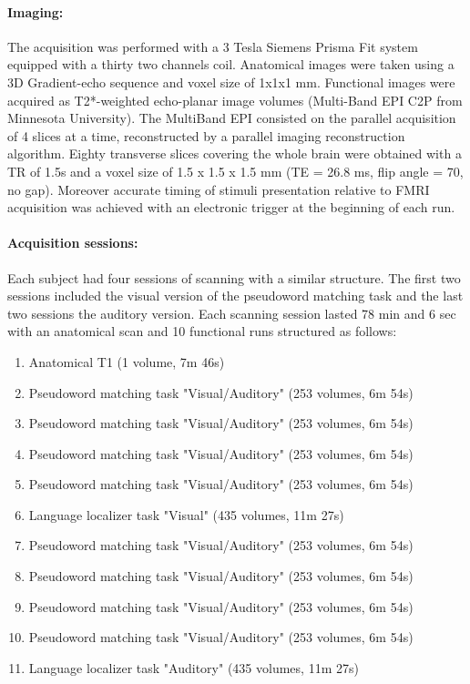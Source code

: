 \paragraph{Imaging:}
The acquisition was performed with a 3 Tesla Siemens Prisma Fit system equipped with a thirty two channels coil.
Anatomical images were taken using a 3D Gradient-echo sequence and voxel size of 1x1x1 mm.
Functional images were acquired as T2*-weighted echo-planar image volumes (Multi-Band EPI C2P from Minnesota University).
The MultiBand EPI consisted on the parallel acquisition of 4 slices at a time, reconstructed by a parallel imaging reconstruction algorithm\citep{chaari2011wavelet}.
Eighty transverse slices covering the whole brain were obtained with a TR of 1.5s and a voxel size of 1.5 x 1.5 x 1.5 mm (TE = 26.8 ms, flip angle = 70, no gap).
Moreover accurate timing of stimuli presentation relative to FMRI acquisition was achieved with an electronic trigger at the beginning of each run.

\paragraph{Acquisition sessions:}
Each subject had four sessions of scanning with a similar structure.
The first two sessions included the visual version of the pseudoword matching task and the last two sessions the auditory version.
Each scanning session lasted 78 min and 6 sec with an anatomical scan and 10 functional runs structured as follows:

\begin{enumerate}[leftmargin=1.5cm, itemsep=-0.12cm, topsep=0.25cm]
\item Anatomical T1 (1 volume, 7m 46s)
\item Pseudoword matching task "Visual/Auditory" (253 volumes, 6m 54s)
\item Pseudoword matching task "Visual/Auditory" (253 volumes, 6m 54s)
\item Pseudoword matching task "Visual/Auditory" (253 volumes, 6m 54s)
\item Pseudoword matching task "Visual/Auditory" (253 volumes, 6m 54s)
\item Language localizer task "Visual" (435 volumes, 11m 27s)
\item Pseudoword matching task "Visual/Auditory" (253 volumes, 6m 54s)
\item Pseudoword matching task "Visual/Auditory" (253 volumes, 6m 54s)
\item Pseudoword matching task "Visual/Auditory" (253 volumes, 6m 54s)
\item Pseudoword matching task "Visual/Auditory" (253 volumes, 6m 54s)
\item Language localizer task "Auditory" (435 volumes, 11m 27s)
\end{enumerate}

